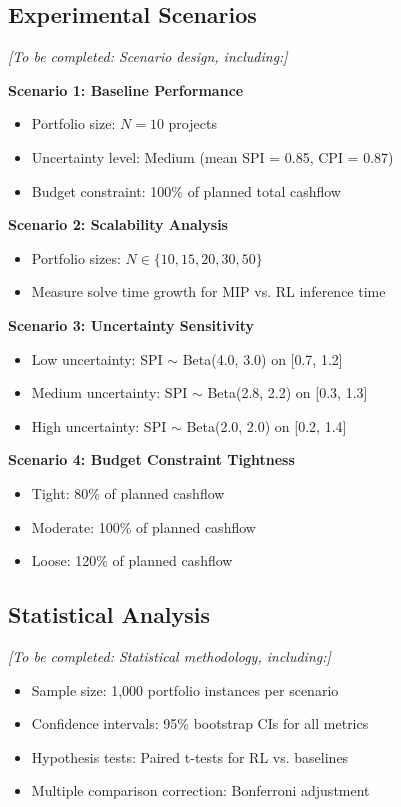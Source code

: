 \subsection{Experimental Scenarios}

\textit{[To be completed: Scenario design, including:]}

\textbf{Scenario 1: Baseline Performance}
\begin{itemize}
    \item Portfolio size: $N = 10$ projects
    \item Uncertainty level: Medium (mean SPI = 0.85, CPI = 0.87)
    \item Budget constraint: 100\% of planned total cashflow
\end{itemize}

\textbf{Scenario 2: Scalability Analysis}
\begin{itemize}
    \item Portfolio sizes: $N \in \{10, 15, 20, 30, 50\}$
    \item Measure solve time growth for MIP vs. RL inference time
\end{itemize}

\textbf{Scenario 3: Uncertainty Sensitivity}
\begin{itemize}
    \item Low uncertainty: SPI $\sim$ Beta(4.0, 3.0) on [0.7, 1.2]
    \item Medium uncertainty: SPI $\sim$ Beta(2.8, 2.2) on [0.3, 1.3]
    \item High uncertainty: SPI $\sim$ Beta(2.0, 2.0) on [0.2, 1.4]
\end{itemize}

\textbf{Scenario 4: Budget Constraint Tightness}
\begin{itemize}
    \item Tight: 80\% of planned cashflow
    \item Moderate: 100\% of planned cashflow
    \item Loose: 120\% of planned cashflow
\end{itemize}

\subsection{Statistical Analysis}

\textit{[To be completed: Statistical methodology, including:]}

\begin{itemize}
    \item Sample size: 1,000 portfolio instances per scenario
    \item Confidence intervals: 95\% bootstrap CIs for all metrics
    \item Hypothesis tests: Paired t-tests for RL vs. baselines
    \item Multiple comparison correction: Bonferroni adjustment
\end{itemize}
